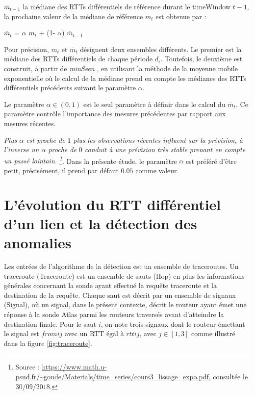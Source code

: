 $ \overline{m}_{t-1}$  la médiane des  RTTs différentiels  de référence durant le timeWindow $ t-1 $,  la prochaine  valeur de la médiane de référence $ \overline{m}_{t}$ est obtenue par : 

\begin{center}
	$ \overline{m}_{t}$ =  $\alpha$ ${m}_{t}$ + (1-  $\alpha$) $ \overline{m}_{t-1}$
\end{center}
Pour précision, $m_t$ et $ \overline{m}_{t}$ désignent deux ensembles différents. Le premier est la médiane des RTTs différentiels de chaque période $d_i$. Toutefois, le deuxième est construit, à partir de \textit{minSeen} , en utilisant la méthode de la moyenne mobile exponentielle où le calcul de la médiane prend en compte les médianes des RTTs différentiels précédents suivant le paramètre $\alpha$.

Le paramètre  $\alpha \in (0, 1)$ est le seul paramètre à définir dans le calcul du $ \overline{m}_{t}$.  Ce paramètre contrôle l'importance  des mesures précédentes par rapport aux mesures récentes.

\guillemotleft \textit{Plus $\alpha$ est proche de $ 1 $ plus les observations récentes influent sur la prévision, à l'inverse un $\alpha$ proche de $0$ conduit à une prévision très stable prenant en compte un passé lointain. \footnote{Source : \url{https://www.math.u-psud.fr/~goude/Materials/time_series/cours3_lissage_expo.pdf}, consultée le $30/09/2018$.}}\guillemotright.  Dans la présente étude, le paramètre $\alpha$ est préféré d'être petit, précisément, il prend par défaut $0.05$ comme valeur.


\section{L'évolution du RTT différentiel d'un lien et  la détection des anomalies} \label{rttevolution}


Les entrées de l'algorithme de la détection est un ensemble de traceroutes. Un traceroute (Traceroute) est un ensemble de sauts (Hop) en plus les informations générales concernant la sonde ayant effectué la requête traceroute et la destination de la requête. Chaque saut est décrit par un ensemble de signaux (Signal), où un signal, dans le présent contexte, décrit le routeur ayant émet une réponse à la sonde Atlas parmi les routeurs traversés avant d'atteindre la destination finale.  Pour le saut $i$, on note trois signaux dont le routeur émettant le signal est $fromij$ avec un RTT égal à $rttij$, avec $j \in [1,3]$ comme illustré dans la figure \ref{fig:traceroute}.

